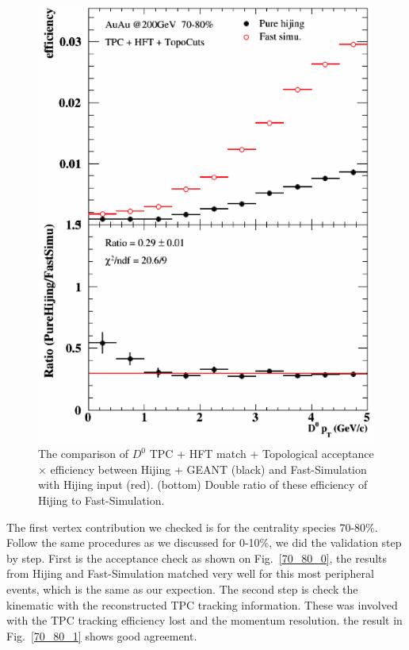 \documentclass[a4paper]{article}
\begin{document}
\begin{figure}[htbp]
\begin{minipage}[htbp]{0.47\linewidth}
\includegraphics[width=1.0\textwidth,angle=0]{fig/70_80.png} 
\caption{ The comparison of $D^0$ TPC + HFT match + Topological acceptance $\times$ efficiency between Hijing + GEANT (black) and Fast-Simulation with Hijing input (red). (bottom) Double ratio of these efficiency of Hijing to Fast-Simulation.\label{70_80_3}}
\end{minipage}
\end{figure}

The first vertex contribution we checked is for the centrality species 70-80\%. Follow the same procedures as we discussed for 0-10\%, we did the validation step by step. First is the acceptance check as shown on Fig.~\ref{70_80_0}, the results from Hijing and Fast-Simulation matched very well for this most peripheral events, which is the same as our expection. The second step is check the kinematic with the reconstructed TPC tracking information. These was involved with the TPC tracking efficiency lost and the momentum resolution. the result in Fig.~\ref{70_80_1} shows good agreement.
\end{document}
